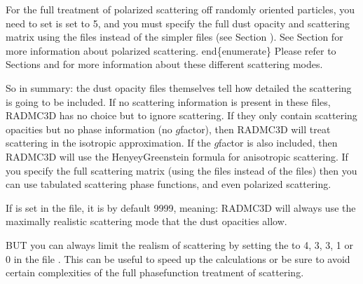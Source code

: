 \documentclass[letterpaper,10pt,english]{sphinxmanual}
\begin{document}
\begin{itemize}
For the full treatment of polarized scattering off randomly oriented
particles, you need to set  is set to 5, and you must
specify the full dust opacity and scattering matrix using the
 files instead of the simpler 
files (see Section {\hyperref[\detokenize{inputoutputfiles:sec-dustkapscatmat-files}]{}}).  See Section
{\hyperref[\detokenize{dustradtrans:sec-polarized-scattering}]{}} for more information about polarized
scattering.  end\{enumerate\} Please refer to Sections
{\hyperref[\detokenize{dustradtrans:sec-scat-phasefunc}]{}} and {\hyperref[\detokenize{dustradtrans:sec-polarized-scattering}]{}} for more
information about these different scattering modes.

\end{itemize}

So in summary: the dust opacity files themselves tell how detailed the
scattering is going to be included. If no scattering information is present in
these files, RADMC\sphinxhyphen{}3D has no choice but to ignore scattering. If they only
contain scattering opacities but no phase information (no \(g\)\sphinxhyphen{}factor),
then RADMC\sphinxhyphen{}3D will treat scattering in the isotropic approximation. If the
\(g\)\sphinxhyphen{}factor is also included, then RADMC\sphinxhyphen{}3D will use the Henyey\sphinxhyphen{}Greenstein
formula for anisotropic scattering. If you specify the full scattering matrix
(using the  files instead of the 
files) then you can use tabulated scattering phase functions, and even polarized
scattering.

If  is  set in the  file, it is by
default 9999, meaning: RADMC\sphinxhyphen{}3D will always use the maximally realistic
scattering mode that the dust opacities allow.

BUT you can always limit the realism of scattering by setting the
 to 4, 3, 3, 1 or 0 in the file . This can
be useful to speed up the calculations or be sure to avoid certain complexities
of the full phase\sphinxhyphen{}function treatment of scattering.
\end{document}
